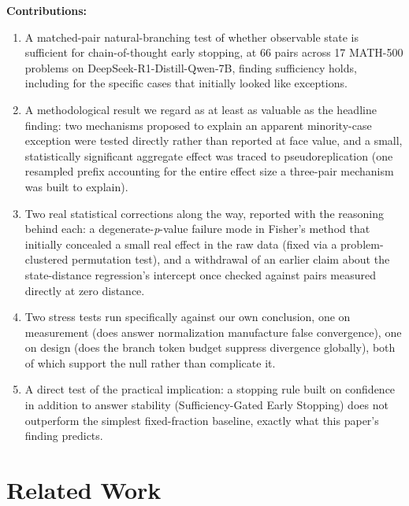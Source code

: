 \documentclass{article}
\begin{document}
\textbf{Contributions:}
\begin{enumerate}
  \item A matched-pair natural-branching test of whether observable state is sufficient for chain-of-thought early stopping, at 66 pairs across 17 MATH-500 problems on DeepSeek-R1-Distill-Qwen-7B, finding sufficiency holds, including for the specific cases that initially looked like exceptions.
  \item A methodological result we regard as at least as valuable as the headline finding: two mechanisms proposed to explain an apparent minority-case exception were tested directly rather than reported at face value, and a small, statistically significant aggregate effect was traced to pseudoreplication (one resampled prefix accounting for the entire effect size a three-pair mechanism was built to explain).
  \item Two real statistical corrections along the way, reported with the reasoning behind each: a degenerate-\emph{p}-value failure mode in Fisher's method that initially concealed a small real effect in the raw data (fixed via a problem-clustered permutation test), and a withdrawal of an earlier claim about the state-distance regression's intercept once checked against pairs measured directly at zero distance.
  \item Two stress tests run specifically against our own conclusion, one on measurement (does answer normalization manufacture false convergence), one on design (does the branch token budget suppress divergence globally), both of which support the null rather than complicate it.
  \item A direct test of the practical implication: a stopping rule built on confidence in addition to answer stability (Sufficiency-Gated Early Stopping) does not outperform the simplest fixed-fraction baseline, exactly what this paper's finding predicts.
\end{enumerate}

\section{Related Work}
\label{sec:relatedwork}
\end{document}
